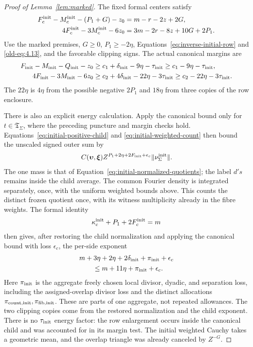 \documentclass[12pt]{article}
\begin{document}
\begin{proof}[Proof of Lemma~\ref{lem:marked}]
The fixed formal centers satisfy
\[
 \begin{aligned}
 F_c^{\rm init}-M_c^{\rm init}-(P_1+G)-z_0&=m-r-2z+2G,\\
 4F_c^{\rm init}-3M_c^{\rm init}-6z_0&=3m-2r-8z+10G+2P_1.
 \end{aligned}
\]
Use the marked premises, \(G\ge0\), \(P_1\ge-2\eta\),
Equations~\eqref{eq:inverse-initial-row} and \eqref{old-eq:4.13}, and
the favorable clipping signs.  The actual canonical margins are
\begin{equation}\label{eq:inverse-initial-margins}
 \begin{aligned}
 F_{\rm init}-M_{\rm init}-Q_{\rm init}-z_0
   &\ge c_1+\delta_{\rm init}-9\eta-\tau_{\rm init}
     \ge c_1-9\eta-\tau_{\rm init},\\
 4F_{\rm init}-3M_{\rm init}-6z_0
   &\ge c_2+4\delta_{\rm init}-22\eta-3\tau_{\rm init}
     \ge c_2-22\eta-3\tau_{\rm init}.
 \end{aligned}
\end{equation}
The \(22\eta\) is \(4\eta\) from the possible negative \(2P_1\) and
\(18\eta\) from three copies of the row enclosure.

There is also an explicit energy calculation.  Apply the canonical
bound only for \(t\in\mathfrak T_\Sigma\), where the preceding puncture
and margin checks hold.  Equations~\eqref{eq:initial-positive-child}
and \eqref{eq:initial-weighted-count} then bound the unscaled signed
outer sum by
\[
 C(\boldsymbol\upsilon,\boldsymbol\xi)
 Z^{P_1+2\eta+2F_{\rm init}+\epsilon_c}
 \|\nu_\Sigma^{\rm init}\|.
\]
The one mass is that of Equation~\eqref{eq:initial-normalized-quotients};
the label \(d's\) remains inside the child average.  The common
Fourier density is integrated separately, once, with the uniform
weighted bounds above.  This counts the distinct frozen quotient
once, with its witness multiplicity already in the fibre weights.
The formal identity
\[
 \kappa_c^{\rm init}+P_1+2F_c^{\rm init}=m
\]
then gives, after restoring the child normalization and applying the
canonical bound with loss \(\epsilon_c\), the per-side exponent
\begin{equation}\label{eq:inverse-initial-energy}
 \begin{split}
 &m+3\eta+2\eta+2\delta_{\rm init}+\pi_{\rm init}+\epsilon_c\\
 &\qquad\le m+11\eta+\pi_{\rm init}+\epsilon_c.
 \end{split}
\end{equation}
Here \(\pi_{\rm init}\) is the aggregate freely chosen local divisor,
dyadic, and separation loss, including the assigned-overlap divisor
loss and the distinct allocations
\(\pi_{{\rm count},{\rm init}},\pi_{{\rm fib},{\rm init}}\).
These are parts of one aggregate, not repeated allowances.
The two clipping copies come from the restored normalization and
the child exponent.  There is no \(\tau_{\rm init}\) energy factor: the
row enlargement occurs inside the canonical child and was accounted for
in its margin test.  The initial weighted Cauchy takes a geometric mean,
and the overlap triangle was already canceled by \(Z^{-G}\).


\end{proof}
\end{document}
